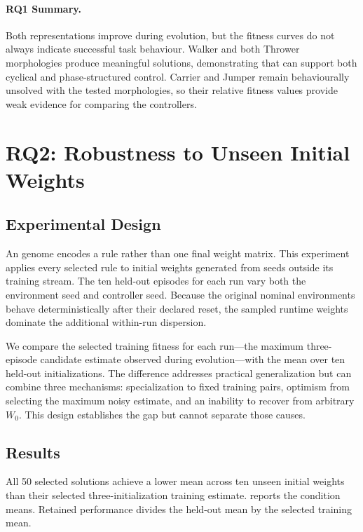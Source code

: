 \paragraph{RQ1 Summary.} Both representations improve during evolution, but the fitness curves do not always indicate successful task behaviour. Walker and both Thrower morphologies produce meaningful solutions, demonstrating that \nchl{} can support both cyclical and phase-structured control. Carrier and Jumper remain behaviourally unsolved with the tested morphologies, so their relative fitness values provide weak evidence for comparing the controllers.

\clearpage
\section{RQ2: Robustness to Unseen Initial Weights}
\label{sec:rq2}

\subsection{Experimental Design}

An \nchl{} genome encodes a rule rather than one final weight matrix. This experiment applies every selected rule to initial weights generated from seeds outside its training stream. The ten held-out episodes for each run vary both the environment seed and controller seed. Because the original nominal environments behave deterministically after their declared reset, the sampled runtime weights dominate the additional within-run dispersion.

We compare the selected training fitness for each run---the maximum three-episode candidate estimate observed during evolution---with the mean over ten held-out initializations. The difference addresses practical generalization but can combine three mechanisms: specialization to fixed training pairs, optimism from selecting the maximum noisy estimate, and an inability to recover from arbitrary $W_0$. This design establishes the gap but cannot separate those causes.

\subsection{Results}

All 50 selected \nchl{} solutions achieve a lower mean across ten unseen initial weights than their selected three-initialization training estimate.  reports the condition means. Retained performance divides the held-out mean by the selected training mean.

